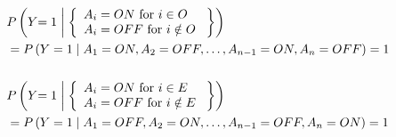 \documentclass{article}
\numberwithin{equation}{section}
\numberwithin{figure}{section}
\numberwithin{table}{section}
\begin{document}
\begin{equation}
\begin{split}
&P\left(Y\mathrm{=1}\mathrel{\left|\vphantom{Y\mathrm{=1} \left\{ \begin{array}{l}
A_i=ON\ \mathrm{for}\ i\in O\  \\ 
A_i=OFF\ \mathrm{for}\ i\notin O\  \end{array}
\right\}}\right.\kern-\nulldelimiterspace}\left\{ \begin{array}{l}
A_i=ON\ \mathrm{for}\ i\in O\  \\ 
A_i=OFF\ \mathrm{for}\ i\notin O\  \end{array}
\right\}\right)\\
&=P\left(Y=1\mathrel{\left|\vphantom{Y=1 A_1=ON,A_2=OFF,\dots ,A_{n-1}=ON,A_n=OFF}\right.\kern-\nulldelimiterspace}A_1=ON,A_2=OFF,\dots ,A_{n-1}=ON,A_n=OFF\right)=1\\
\\
&P\left(Y\mathrm{=1}\mathrel{\left|\vphantom{Y\mathrm{=1} \left\{ \begin{array}{l}
A_i=ON\ \mathrm{for}\ i\in E\  \\ 
A_i=OFF\ \mathrm{for}\ i\notin E\  \end{array}
\right\}}\right.\kern-\nulldelimiterspace}\left\{ \begin{array}{l}
A_i=ON\ \mathrm{for}\ i\in E\  \\ 
A_i=OFF\ \mathrm{for}\ i\notin E\  \end{array}
\right\}\right)\\
&=P\left(Y=1\mathrel{\left|\vphantom{Y=1 A_1=OFF,A_2=ON,\dots ,A_{n-1}=OFF,A_n=ON}\right.\kern-\nulldelimiterspace}A_1=OFF,A_2=ON,\dots ,A_{n-1}=OFF,A_n=ON\right)=1
\end{split}
\label{xor-conditions}
\end{equation} 
\end{document}
